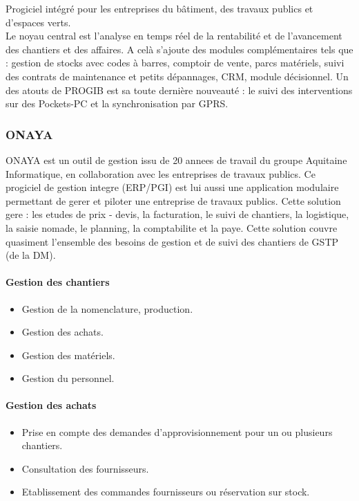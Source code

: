 		Progiciel intégré pour les entreprises du bâtiment, des travaux publics et d'espaces verts.\\

		Le noyau central est l'analyse en temps réel de la rentabilité et de l'avancement des chantiers et des affaires. A celà s'ajoute des modules complémentaires tels que
		: gestion de stocks avec codes à barres, comptoir de vente, parcs matériels, suivi des contrats de maintenance et petits dépannages, CRM, module décisionnel.
		Un des atouts de PROGIB est sa toute dernière nouveauté : le suivi des interventions sur des Pockets-PC et la synchronisation par GPRS.

                \subsubsection{ONAYA}
                ONAYA est un outil de gestion issu de 20 annees de travail du groupe Aquitaine Informatique, en collaboration avec les entreprises de travaux publics. Ce progiciel de gestion integre (ERP/PGI) est lui aussi une application modulaire permettant de gerer et piloter une entreprise de travaux publics. Cette solution gere : les etudes de prix - devis, la facturation, le suivi de chantiers, la
logistique, la saisie nomade, le planning, la comptabilite et la paye. Cette solution couvre quasiment l'ensemble des besoins de gestion et de suivi des chantiers de GSTP (de la DM).

                                \paragraph{Gestion des chantiers}
                                \begin{itemize}
                                    \item Gestion de la nomenclature, production.
                                    \item Gestion des achats.
                                    \item Gestion des matériels.
                                    \item Gestion du personnel.
                                \end{itemize}

                                \paragraph{Gestion des achats}
                                \begin{itemize}
                                    \item Prise en compte des demandes d'approvisionnement pour un ou plusieurs chantiers.
                                    \item Consultation des fournisseurs.
                                    \item Etablissement des commandes fournisseurs ou réservation sur stock.
                                \end{itemize}

